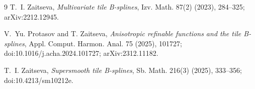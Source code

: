 \documentclass[11pt]{article}
\theoremstyle{remark}
\begin{document}
\begin{thebibliography}{9}
T.~I. Zaitseva,
\emph{Multivariate tile B-splines},
Izv. Math. 87(2) (2023), 284--325;
arXiv:2212.12945.

V.~Yu. Protasov and T. Zaitseva,
\emph{Anisotropic refinable functions and the tile B-splines},
Appl. Comput. Harmon. Anal. 75 (2025), 101727;
doi:10.1016/j.acha.2024.101727; arXiv:2312.11182.

T.~I. Zaitseva,
\emph{Supersmooth tile B-splines},
Sb. Math. 216(3) (2025), 333--356;
doi:10.4213/sm10212e.
\end{thebibliography}
\end{document}
